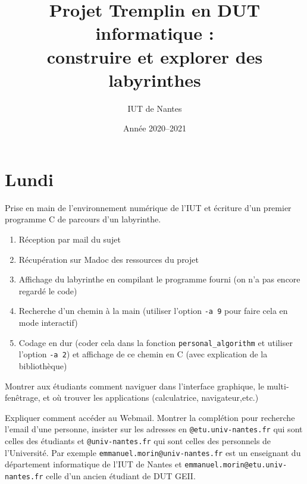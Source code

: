 \documentclass[a4paper]{article}
\title{Projet \textsf{Tremplin en DUT informatique} : \\
construire et explorer des labyrinthes}
\author{IUT de Nantes}
\date{Année 2020--2021}
\newenvironment{objectif}{%
  \begin{framed}%
  \noindent{\bf Objectifs du jour~:}%
}{%
  \end{framed}%
}
\newenvironment{enseignants}[1]{\noindent\color{blue}{\bf #1}}{}
\begin{document}
\maketitle

\section{Lundi}

\begin{objectif}
  Prise en main de l’environnement numérique de l'IUT et écriture d'un premier programme C de parcours d'un labyrinthe.
\end{objectif}

  \begin{enseignants}{Comment ça va se passer~:}
    \begin{enumerate}
    \item Réception par mail du sujet
    \item Récupération sur Madoc des ressources du projet
    \item Affichage du labyrinthe en compilant le programme fourni (on n'a pas encore regardé le code)
    \item Recherche d'un chemin à la main (utiliser l'option \verb|-a 9| pour faire cela en mode interactif)
    \item Codage en dur (coder cela dans la fonction \verb|personal_algorithm| et utiliser l'option \verb|-a 2|) et affichage de ce chemin en C (avec explication de la bibliothèque)
    \end{enumerate}
  \end{enseignants}

\begin{enseignants}{Environnement Linux~:}
Montrer aux étudiants comment naviguer dans l’interface graphique, le multi-fenêtrage, et où trouver les applications (calculatrice, navigateur,etc.)
\end{enseignants}

\begin{enseignants}{Webmail~:}
  Expliquer comment accéder au Webmail.
  Montrer la complétion pour recherche l’email d’une personne, insister sur les adresses en \texttt{@etu.univ-nantes.fr} qui sont celles des étudiants et \texttt{@univ-nantes.fr} qui sont celles des personnels de l’Université. Par exemple \texttt{emmanuel.morin@univ-nantes.fr} est un enseignant du département informatique de l’IUT de Nantes et \texttt{emmanuel.morin@etu.univ-nantes.fr} celle d’un ancien étudiant de DUT GEII.
\end{enseignants}
\end{document}
